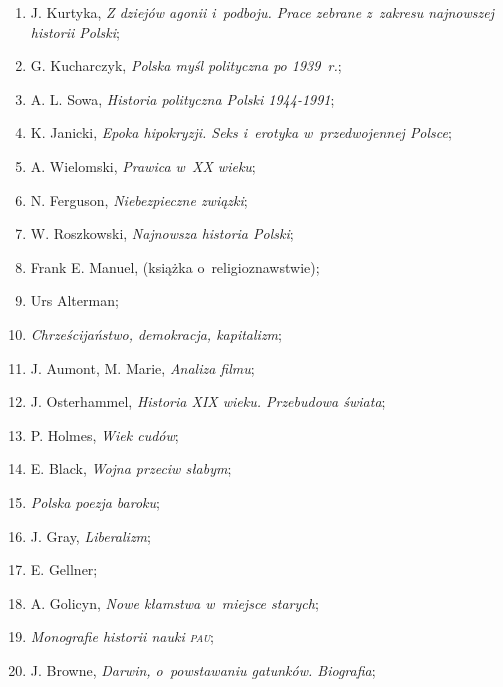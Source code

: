 \documentclass[a4paper,11pt]{article}
\begin{document}
\begin{enumerate}
\item J. Kurtyka, \textit{Z dziejów agonii i~podboju. Prace zebrane
    z~zakresu najnowszej historii Polski};

\item G. Kucharczyk, \textit{Polska myśl polityczna po 1939~r.};

\item A. L. Sowa, \textit{Historia polityczna Polski 1944-1991};

\item K. Janicki, \textit{Epoka hipokryzji. Seks i~erotyka
    w~przedwojennej Polsce};

\item A. Wielomski, \textit{Prawica w~XX wieku};

\item N. Ferguson, \textit{Niebezpieczne związki};

\item W. Roszkowski, \textit{Najnowsza historia Polski};

\item Frank E. Manuel, (książka o~religioznawstwie);

\item Urs Alterman;

\item \textit{Chrześcijaństwo, demokracja, kapitalizm};

\item J. Aumont, M. Marie, \textit{Analiza filmu};

\item J. Osterhammel, \textit{Historia XIX wieku. Przebudowa świata};

\item P. Holmes, \textit{Wiek cudów};

\item E. Black, \textit{Wojna przeciw słabym};

\item \textit{Polska poezja baroku};

\item J. Gray, \textit{Liberalizm};

\item E. Gellner;

\item A. Golicyn, \textit{Nowe kłamstwa w~miejsce starych};

\item \textit{Monografie historii nauki \textsc{pau}};

\item J. Browne, \textit{Darwin, o~powstawaniu gatunków. Biografia};


\end{enumerate}
\end{document}
